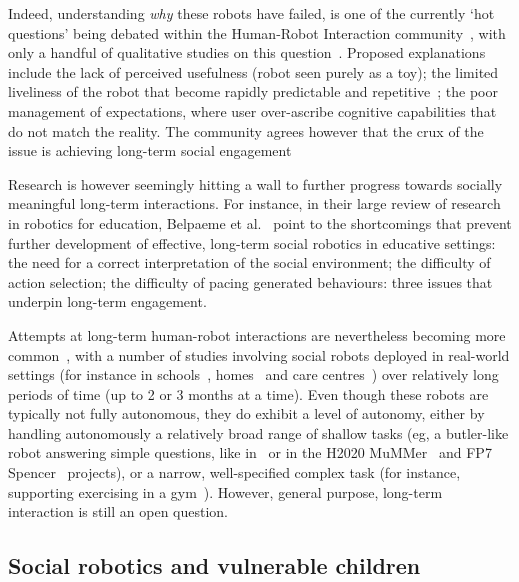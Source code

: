 \documentclass[11pt,a4paper]{report}
\begin{document}
Indeed, understanding \emph{why} these robots have failed, is one of the
currently `hot questions' being debated within the Human-Robot Interaction
community~\cite{hoffman2019anki}, with only a handful of qualitative studies on
this question~\cite{dereshev2019longterm,degraaf2017phased}. Proposed
explanations include the lack of perceived usefulness (robot seen purely as a
toy); the limited liveliness of the robot that become rapidly predictable and
repetitive~\cite{lemaignan2014cognitive}; the poor management of expectations,
where user over-ascribe cognitive capabilities that do not match the reality.
The community agrees however that the crux of the issue is achieving long-term
social engagement~\cite{yang2018grand,hoffman2019anki}

Research is however seemingly hitting a wall to further progress towards
socially meaningful long-term interactions. For instance, in their large review
of research in robotics for education, Belpaeme et al.~\cite{belpaeme2018social}
point to the shortcomings that prevent further development of effective,
long-term social robotics in educative settings: the need for a correct
interpretation of the social environment; the difficulty of action selection;
the difficulty of pacing generated behaviours: three issues that underpin
long-term engagement.

Attempts at long-term human-robot interactions are nevertheless becoming more
common~\cite{kunze2018artificial,leite2013social}, with a number of studies
involving social robots deployed in real-world settings (for instance in
schools~\cite{leite2014empathic,westlund2017measuring,
lemaignan2016learning,coninx2016towards}, homes~\cite{degraaf2017phased} and
care centres~\cite{hawes2017strands,winkle2020couch}) over relatively long
periods of time (up to 2 or 3 months at a time). Even though these robots are
typically not fully autonomous, they do exhibit a level of autonomy, either by
handling autonomously a relatively broad range of shallow tasks (eg, a
butler-like robot answering simple questions, like in~\cite{hawes2017strands} or
in the H2020 MuMMer~\cite{heikkila2018can} and FP7
Spencer~\cite{triebel2016spencer} projects), or a narrow, well-specified complex
task (for instance, supporting exercising in a gym~\cite{winkle2020couch}).
However, general purpose, long-term interaction is still an open question.


\subsection{Social robotics and vulnerable children}
\end{document}
